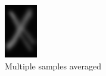\documentclass[11pt]{IEEEtran}
\begin{document}
\begin{figure}[h]
\begin{subfigure}[b]{0.15\textwidth}
         \includegraphics[width=\textwidth]{tem2}
         \caption{Multiple samples averaged}
         \label{fig:tem2}
     \end{subfigure}
     \begin{subfigure}[b]{0.15\textwidth}
         \centering

\end{subfigure}
\end{figure}
\end{document}
